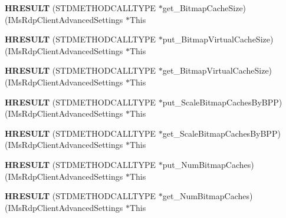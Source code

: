 \begin{DoxyCompactItemize}
{\bfseries H\+R\+E\+S\+U\+LT} (S\+T\+D\+M\+E\+T\+H\+O\+D\+C\+A\+L\+L\+T\+Y\+PE $\ast$get\+\_\+\+Bitmap\+Cache\+Size)(I\+Ms\+Rdp\+Client\+Advanced\+Settings $\ast$This
\item 
\mbox{\label{struct_i_ms_rdp_client_advanced_settings_vtbl_ae458f41d42836c787f371cc82aa9c3dd}} 
{\bfseries H\+R\+E\+S\+U\+LT} (S\+T\+D\+M\+E\+T\+H\+O\+D\+C\+A\+L\+L\+T\+Y\+PE $\ast$put\+\_\+\+Bitmap\+Virtual\+Cache\+Size)(I\+Ms\+Rdp\+Client\+Advanced\+Settings $\ast$This
\item 
\mbox{\label{struct_i_ms_rdp_client_advanced_settings_vtbl_a393ebcf4c34d5904bf617e758bb8b0e2}} 
{\bfseries H\+R\+E\+S\+U\+LT} (S\+T\+D\+M\+E\+T\+H\+O\+D\+C\+A\+L\+L\+T\+Y\+PE $\ast$get\+\_\+\+Bitmap\+Virtual\+Cache\+Size)(I\+Ms\+Rdp\+Client\+Advanced\+Settings $\ast$This
\item 
\mbox{\label{struct_i_ms_rdp_client_advanced_settings_vtbl_a9ca917e8823b4f2b126c3ece16d4389a}} 
{\bfseries H\+R\+E\+S\+U\+LT} (S\+T\+D\+M\+E\+T\+H\+O\+D\+C\+A\+L\+L\+T\+Y\+PE $\ast$put\+\_\+\+Scale\+Bitmap\+Caches\+By\+B\+PP)(I\+Ms\+Rdp\+Client\+Advanced\+Settings $\ast$This
\item 
\mbox{\label{struct_i_ms_rdp_client_advanced_settings_vtbl_ab852a260256f9188160eb335c036cfa0}} 
{\bfseries H\+R\+E\+S\+U\+LT} (S\+T\+D\+M\+E\+T\+H\+O\+D\+C\+A\+L\+L\+T\+Y\+PE $\ast$get\+\_\+\+Scale\+Bitmap\+Caches\+By\+B\+PP)(I\+Ms\+Rdp\+Client\+Advanced\+Settings $\ast$This
\item 
\mbox{\label{struct_i_ms_rdp_client_advanced_settings_vtbl_a247023bf29364c184b73070bd3af44a5}} 
{\bfseries H\+R\+E\+S\+U\+LT} (S\+T\+D\+M\+E\+T\+H\+O\+D\+C\+A\+L\+L\+T\+Y\+PE $\ast$put\+\_\+\+Num\+Bitmap\+Caches)(I\+Ms\+Rdp\+Client\+Advanced\+Settings $\ast$This
\item 
\mbox{\label{struct_i_ms_rdp_client_advanced_settings_vtbl_a2103bba5e522a0a7e86ed7f96e61e3b1}} 
{\bfseries H\+R\+E\+S\+U\+LT} (S\+T\+D\+M\+E\+T\+H\+O\+D\+C\+A\+L\+L\+T\+Y\+PE $\ast$get\+\_\+\+Num\+Bitmap\+Caches)(I\+Ms\+Rdp\+Client\+Advanced\+Settings $\ast$This

\end{DoxyCompactItemize}
